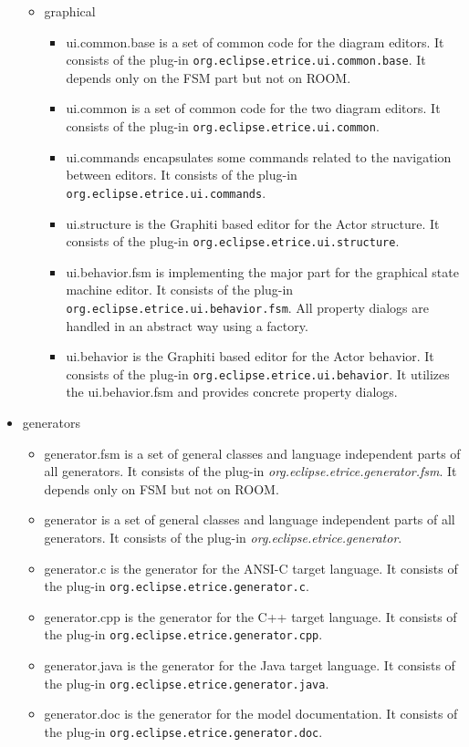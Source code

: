\begin{itemize}
\begin{itemize}
\item graphical
\begin{itemize}
\item ui.common.base is a set of common code for the diagram editors. It consists of the plug-in 
\texttt{org.eclipse.etrice.ui.common.base}. It depends only on the FSM part but not on ROOM.
\item ui.common is a set of common code for the two diagram editors. It consists of the plug-in 
\texttt{org.eclipse.etrice.ui.common}.
\item ui.commands encapsulates some commands related to the navigation between \eTrice{} editors. It consists 
of the plug-in \texttt{org.eclipse.etrice.ui.commands}.
\item ui.structure is the Graphiti based editor for the Actor structure. It consists of the plug-in 
\texttt{org.eclipse.etrice.ui.structure}.
\item ui.behavior.fsm is implementing the major part for the graphical state machine editor. It consists of the plug-in 
\texttt{org.eclipse.etrice.ui.behavior.fsm}. All property dialogs are handled in an abstract way
using a factory.
\item ui.behavior is the Graphiti based editor for the Actor behavior. It consists of the plug-in 
\texttt{org.eclipse.etrice.ui.behavior}. It utilizes the ui.behavior.fsm and provides concrete property dialogs.
\end{itemize}
\end{itemize}

\item generators
\begin{itemize}
\item generator.fsm is a set of general classes and language independent parts of all generators. It consists 
of the plug-in \textit{org.eclipse.etrice.generator.fsm}. It depends only on FSM but not on ROOM.
\item generator is a set of general classes and language independent parts of all generators. It consists 
of the plug-in \textit{org.eclipse.etrice.generator}.
\item generator.c is the generator for the ANSI-C target language. It consists of the plug-in 
\texttt{org.eclipse.etrice.generator.c}.
\item generator.cpp is the generator for the C++ target language. It consists of the plug-in 
\texttt{org.eclipse.etrice.generator.cpp}.
\item generator.java is the generator for the Java target language. It consists of the plug-in 
\texttt{org.eclipse.etrice.generator.java}.
\item generator.doc is the generator for the model documentation. It consists of the plug-in 
\texttt{org.eclipse.etrice.generator.doc}.
\end{itemize}
\end{itemize}


